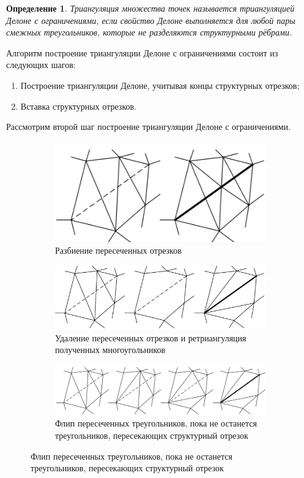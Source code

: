 \documentclass{fefu}
\newtheorem{definition}{Определение}
\begin{document}
\begin{definition}
    Триангуляция множества точек называется триангуляцией Делоне с ограничениями, если свойство Делоне
    выполняется для любой пары смежных треугольников, которые не разделяются структурными рёбрами.
\end{definition}

Алгоритм построение триангуляции Делоне с ограничениями состоит из следующих шагов:
\begin{enumerate}
    \item Построение триангуляции Делоне, учитывая концы структурных отрезков;
    \item Вставка структурных отрезков.
\end{enumerate}

Рассмотрим второй шаг построение триангуляции Делоне с ограничениями.
\begin{figure}[H]
    \centering
    \begin{subfigure}[t]{\linewidth}
        \centering
        \includegraphics[scale=0.8]{images/BuildDestroying.png}
        \caption{Разбиение пересеченных отрезков}
        \label{BuildDestroying}
    \end{subfigure}
    \begin{subfigure}[t]{\linewidth}
        \centering
        \includegraphics[scale=0.8]{images/DestroyAndBuild}
        \caption{Удаление пересеченных отрезков и ретриангуляция полученных многоугольников}
        \label{DestroyAndBuild}
    \end{subfigure}
    \begin{subfigure}[t]{\linewidth}
        \centering
        \includegraphics[scale=0.8]{images/Rebuilding.png}
        \caption{Флип пересеченных треугольников, пока не останется треугольников, пересекающих структурный отрезок}
        \label{Rebuilding}
    \end{subfigure}
\end{figure}
\end{document}
